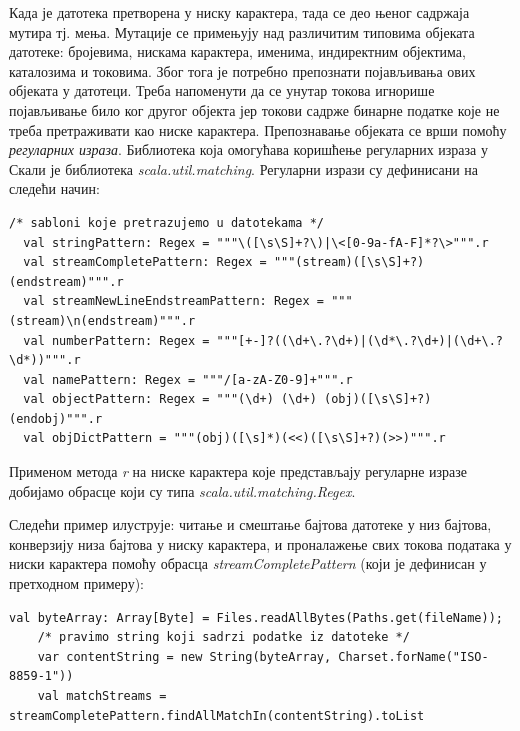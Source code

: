 \documentclass[12pt,oneside]{memoir}
\begin{document}
Када је датотека претворена у ниску карактера, тада се део њеног садржаја мутира тј. мења. Мутације се примењују над различитим типовима објеката датотеке: бројевима, нискама карактера, именима, индиректним објектима, каталозима и токовима. Због тога је потребно препознати појављивања ових објеката у датотеци. Треба напоменути да се унутар токова игнорише појављивање било ког другог објекта јер токови садрже бинарне податке које не треба претраживати као ниске карактера. Препознавање објеката се врши помоћу \textit{регуларних израза}. 
%
Библиотека која омогућава коришћење регуларних израза у Скали је библиотека \textit{scala.util.matching}. Регуларни изрази су дефинисани на следећи начин:

\begin{lstlisting}[frame=single]
    /* sabloni koje pretrazujemo u datotekama */
  val stringPattern: Regex = """\([\s\S]+?\)|\<[0-9a-fA-F]*?\>""".r
  val streamCompletePattern: Regex = """(stream)([\s\S]+?)(endstream)""".r
  val streamNewLineEndstreamPattern: Regex = """(stream)\n(endstream)""".r
  val numberPattern: Regex = """[+-]?((\d+\.?\d+)|(\d*\.?\d+)|(\d+\.?\d*))""".r
  val namePattern: Regex = """/[a-zA-Z0-9]+""".r
  val objectPattern: Regex = """(\d+) (\d+) (obj)([\s\S]+?)(endobj)""".r
  val objDictPattern = """(obj)([\s]*)(<<)([\s\S]+?)(>>)""".r    
\end{lstlisting}

Применом метода \textit{r} на ниске карактера које представљају регуларне изразе добијамо обрасце који су типа \textit{scala.util.matching.Regex}.

Следећи пример илуструје: читање и смештање бајтова датотеке у низ бајтова, конверзију низа бајтова у ниску карактера, и проналажење свих токова података у ниски карактера помоћу обрасца \textit{streamCompletePattern} (који је дефинисан у претходном примеру):

\begin{lstlisting}[frame=single]
    val byteArray: Array[Byte] = Files.readAllBytes(Paths.get(fileName));
    /* pravimo string koji sadrzi podatke iz datoteke */
    var contentString = new String(byteArray, Charset.forName("ISO-8859-1"))
    val matchStreams = streamCompletePattern.findAllMatchIn(contentString).toList
\end{lstlisting}
\end{document}

